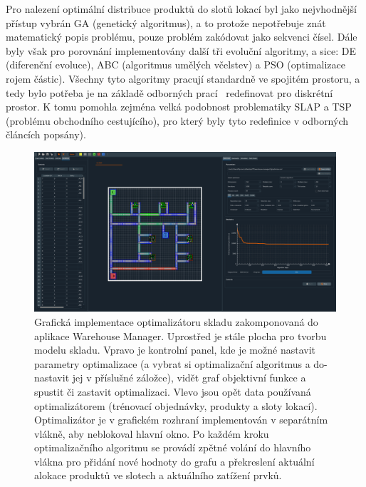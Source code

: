 Pro nalezení optimální distribuce produktů do slotů lokací byl jako nejvhodnější přístup vybrán GA (genetický algoritmus), a to protože nepotřebuje znát matematický popis problému, pouze problém zakódovat jako sekvenci čísel. Dále byly však pro porovnání implementovány další tři evoluční algoritmy, a sice: DE (diferenční evoluce), ABC (algoritmus umělých včelstev) a PSO (optimalizace rojem částic). Všechny tyto algoritmy pracují standardně ve spojitém prostoru, a tedy bylo potřeba je na základě odborných prací~\cite{ABC_TSP, DE_GA_TSP, PSO_GA_TSP, orderedCrossover, GA_TSP} redefinovat pro diskrétní prostor. K tomu pomohla zejména velká podobnost problematiky SLAP a TSP (problému obchodního cestujícího), pro který byly tyto redefinice v odborných článcích popsány).

\begin{figure}[t]
    \centering
    \includegraphics[width=0.99\linewidth]{figures/implementace/WarehouseManagerOpt.png}
    \caption{Grafická implementace optimalizátoru skladu zakomponovaná do aplikace Warehouse Manager. Uprostřed je stále plocha pro tvorbu modelu skladu. Vpravo je kontrolní panel, kde je možné nastavit parametry optimalizace (a vybrat si optimalizační algoritmus a do-nastavit jej v příslušné záložce), vidět graf objektivní funkce a spustit či zastavit optimalizaci. Vlevo jsou opět data používaná optimalizátorem (trénovací objednávky, produkty a sloty lokací). Optimalizátor je v grafickém rozhraní implementován v separátním vlákně, aby neblokoval hlavní okno. Po každém kroku optimalizačního algoritmu se provádí zpětné volání do hlavního vlákna pro přidání nové hodnoty do grafu a překreslení aktuální alokace produktů ve slotech a aktuálního zatížení prvků.}
    \label{fig:UI_optimalizator}
\end{figure}


